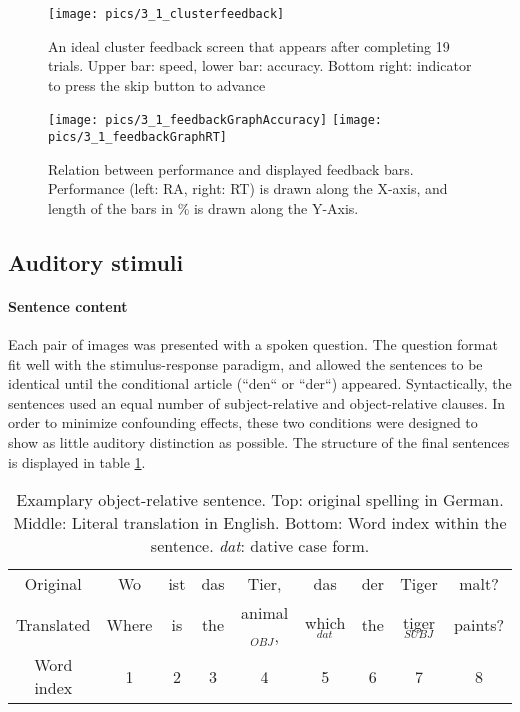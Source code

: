 \begin{figure}[h]
\begin{center}
\vspace{7mm}
\texttt{[image: pics/3\_1\_clusterfeedback]}
\caption{\label{3.1.clusterfeedback} An ideal cluster feedback screen that appears after completing 19 trials. Upper bar: speed, lower bar: accuracy. Bottom right: indicator to  press the skip button to advance}
\end{center}
\end{figure}

\begin{figure}[h]
\begin{center}
\vspace{7mm}
\texttt{[image: pics/3\_1\_feedbackGraphAccuracy]}
\texttt{[image: pics/3\_1\_feedbackGraphRT]}
\caption{\label{3.1.feedbackGraphs} Relation between performance and displayed feedback bars. Performance (left: RA, right: RT) is drawn along the X-axis, and length of the bars in \% is drawn along the Y-Axis.}
\end{center}
\end{figure}

\subsection{Auditory stimuli}\label{3.1.stimuli.auditory}

\paragraph{Sentence content}
Each pair of images was presented with a spoken question.
The question format fit well with the stimulus-response paradigm, and allowed the sentences to be identical until the conditional article (``den`` or ``der``) appeared.
Syntactically, the sentences used an equal number of subject-relative and object-relative clauses.
In order to minimize confounding effects, these two conditions were designed to show as little auditory distinction as possible.
The structure of the final sentences is displayed in table \ref{3.1.sentences}.

\begin{table}[htb]
\vspace{5mm}
\begin{center}
\begin{tabular}{c|cccccccc}
Original & Wo & ist & das & Tier, & das & der & Tiger & malt?\\
Translated & Where & is & the & animal$_{OBJ}$, & which$_{dat}$ & the & tiger$_{SUBJ}$ & paints?\\
Word index & 1 & 2 & 3 & 4 & 5 & 6 & 7 & 8
\end{tabular}
\caption{\label{3.1.sentences} Examplary object-relative sentence. Top: original spelling in German. Middle: Literal translation in English. Bottom: Word index within the sentence. \emph{dat}: dative case form.}
\end{center}
\end{table}

